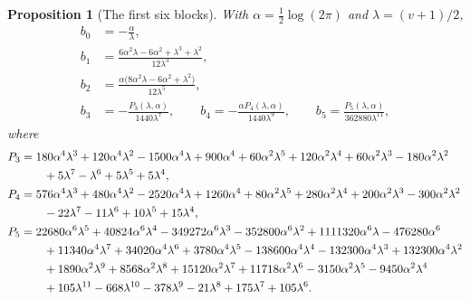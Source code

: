 \documentclass[11pt,a4paper,oneside]{book}
\theoremstyle{plain}
\newtheorem{proposition}[theorem]{Proposition}
\theoremstyle{definition}
\theoremstyle{remark}
\begin{document}
\begin{proposition}[The first six blocks]\label{p6:prop:barnes-blocks}
With $\alpha=\tfrac12\log(2\pi)$ and $\lambda=(v+1)/2$,
\begin{align}
 b_0&=-\frac\alpha\lambda,\label{p6:eq:b0}\\
 b_1&=\frac{6\alpha^{2}\lambda-6\alpha^{2}+\lambda^{3}+\lambda^{2}}
 {12\lambda^{3}},\label{p6:eq:b1}\\
 b_2&=\frac{\alpha\bigl(8\alpha^{2}\lambda-6\alpha^{2}+\lambda^{2}\bigr)}
 {12\lambda^{5}},\label{p6:eq:b2}\\
 b_3&=-\frac{P_3(\lambda,\alpha)}{1440\lambda^{7}},
 \qquad
 b_4=-\frac{\alpha P_4(\lambda,\alpha)}{1440\lambda^{9}},
 \qquad
 b_5=\frac{P_5(\lambda,\alpha)}{362880\lambda^{11}},\label{p6:eq:b345}
\end{align}
where
\begin{align}
 P_3&=180\alpha^{4}\lambda^{3}+120\alpha^{4}\lambda^{2}
 -1500\alpha^{4}\lambda+900\alpha^{4}
 +60\alpha^{2}\lambda^{5}+120\alpha^{2}\lambda^{4}
 +60\alpha^{2}\lambda^{3}-180\alpha^{2}\lambda^{2}\notag\\
 &\qquad+5\lambda^{7}-\lambda^{6}+5\lambda^{5}+5\lambda^{4},
 \label{p6:eq:P3}\\
 P_4&=576\alpha^{4}\lambda^{3}+480\alpha^{4}\lambda^{2}
 -2520\alpha^{4}\lambda+1260\alpha^{4}
 +80\alpha^{2}\lambda^{5}+280\alpha^{2}\lambda^{4}
 +200\alpha^{2}\lambda^{3}-300\alpha^{2}\lambda^{2}\notag\\
 &\qquad-22\lambda^{7}-11\lambda^{6}+10\lambda^{5}+15\lambda^{4},
 \label{p6:eq:P4}\\
 P_5&=22680\alpha^{6}\lambda^{5}+40824\alpha^{6}\lambda^{4}
 -349272\alpha^{6}\lambda^{3}-352800\alpha^{6}\lambda^{2}
 +1111320\alpha^{6}\lambda-476280\alpha^{6}\notag\\
 &\qquad+11340\alpha^{4}\lambda^{7}+34020\alpha^{4}\lambda^{6}
 +3780\alpha^{4}\lambda^{5}-138600\alpha^{4}\lambda^{4}
 -132300\alpha^{4}\lambda^{3}+132300\alpha^{4}\lambda^{2}\notag\\
 &\qquad+1890\alpha^{2}\lambda^{9}+8568\alpha^{2}\lambda^{8}
 +15120\alpha^{2}\lambda^{7}+11718\alpha^{2}\lambda^{6}
 -3150\alpha^{2}\lambda^{5}-9450\alpha^{2}\lambda^{4}\notag\\
 &\qquad+105\lambda^{11}-668\lambda^{10}-378\lambda^{9}-21\lambda^{8}
 +175\lambda^{7}+105\lambda^{6}.
 \label{p6:eq:P5}
\end{align}
\end{proposition}
\end{document}
